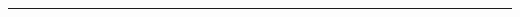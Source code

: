 \documentclass[a0]{a0poster}
\begin{document}
\begin{textblock}{7}
\begin{center}
    \end{center}

    \bigskip
    \hrule
  \end{textblock}
\end{document}
